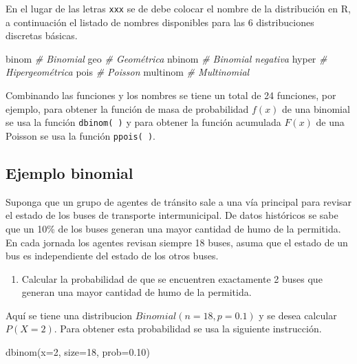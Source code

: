 \documentclass[
]{book}
\makeatletter
\newenvironment{Shaded}{\begin{snugshade}}{\end{snugshade}}
\newcommand{\AttributeTok}[1]{\textcolor[rgb]{0.77,0.63,0.00}{#1}}
\newcommand{\CommentTok}[1]{\textcolor[rgb]{0.56,0.35,0.01}{\textit{#1}}}
\newcommand{\DecValTok}[1]{\textcolor[rgb]{0.00,0.00,0.81}{#1}}
\newcommand{\FloatTok}[1]{\textcolor[rgb]{0.00,0.00,0.81}{#1}}
\newcommand{\FunctionTok}[1]{\textcolor[rgb]{0.00,0.00,0.00}{#1}}
\newcommand{\NormalTok}[1]{#1}
\providecommand{\tightlist}{%
  \setlength{\itemsep}{0pt}\setlength{\parskip}{0pt}}
\newenvironment{kframe}{%
\medskip{}
\setlength{\fboxsep}{.8em}
 \def\at@end@of@kframe{}%
 \ifinner\ifhmode%
  \def\at@end@of@kframe{\end{minipage}}%
  \begin{minipage}{\columnwidth}%
 \fi\fi%
 \def\FrameCommand##1{\hskip\@totalleftmargin \hskip-\fboxsep
 \colorbox{shadecolor}{##1}\hskip-\fboxsep
     \hskip-\linewidth \hskip-\@totalleftmargin \hskip\columnwidth}%
 \MakeFramed {\advance\hsize-\width
   \@totalleftmargin\z@ \linewidth\hsize
   \@setminipage}}%
 {\par\unskip\endMakeFramed%
 \at@end@of@kframe}
\renewenvironment{Shaded}{\begin{kframe}}{\end{kframe}}
\makeatother
\begin{document}
En el lugar de las letras \texttt{xxx} se de debe colocar el nombre de la distribución en R, a continuación el listado de nombres disponibles para las 6 distribuciones discretas básicas.

\begin{Shaded}
\begin{Highlighting}[]
\NormalTok{binom     }\CommentTok{\# Binomial}
\NormalTok{geo       }\CommentTok{\# Geométrica}
\NormalTok{nbinom    }\CommentTok{\# Binomial negativa}
\NormalTok{hyper     }\CommentTok{\# Hipergeométrica}
\NormalTok{pois      }\CommentTok{\# Poisson}
\NormalTok{multinom  }\CommentTok{\# Multinomial}
\end{Highlighting}
\end{Shaded}

Combinando las funciones y los nombres se tiene un total de 24 funciones, por ejemplo, para obtener la función de masa de probabilidad \(f(x)\) de una binomial se usa la función \texttt{dbinom(\ )} y para obtener la función acumulada \(F(x)\) de una Poisson se usa la función \texttt{ppois(\ )}.

\hypertarget{ejemplo-binomial}{%
\subsection*{Ejemplo binomial}\label{ejemplo-binomial}}

Suponga que un grupo de agentes de tránsito sale a una vía principal para revisar el estado de los buses de transporte intermunicipal. De datos históricos se sabe que un 10\% de los buses generan una mayor cantidad de humo de la permitida. En cada jornada los agentes revisan siempre 18 buses, asuma que el estado de un bus es independiente del estado de los otros buses.

\begin{enumerate}
\def\labelenumi{\arabic{enumi})}
\tightlist
\item
  Calcular la probabilidad de que se encuentren exactamente 2 buses que generan una mayor cantidad de humo de la permitida.
\end{enumerate}

Aquí se tiene una distribucion \(Binomial(n=18, p=0.1)\) y se desea calcular \(P(X=2)\). Para obtener esta probabilidad se usa la siguiente instrucción.

\begin{Shaded}
\begin{Highlighting}[]
\FunctionTok{dbinom}\NormalTok{(}\AttributeTok{x=}\DecValTok{2}\NormalTok{, }\AttributeTok{size=}\DecValTok{18}\NormalTok{, }\AttributeTok{prob=}\FloatTok{0.10}\NormalTok{)}
\end{Highlighting}
\end{Shaded}
\end{document}
